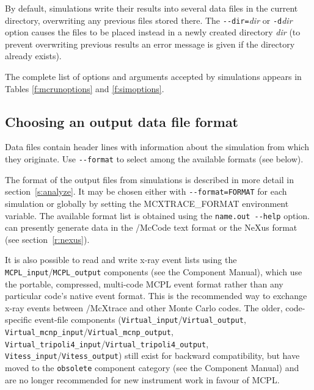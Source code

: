 By default, \MCX simulations write their results into several data files in the
current directory, overwriting any previous files stored there. The
\verb+--dir=+\textit{dir} or \verb+-d+\textit{dir} option causes the files to be
placed instead in a newly created directory \textit{dir} (to prevent overwriting
previous results an error message is given if the directory already exists).


The complete list of options
and arguments accepted by \MCX simulations appears in
Tables \ref{f:mcrunoptions} and \ref{f:simoptions}.

\subsection{Choosing an output data file format}

Data files contain header lines with information about the simulation from which
they originate. Use \verb+--format+ to select among the available formats
(see below).

The format of the output files from \MCX simulations is described in more
detail in section~\ref{s:analyze}. It may be chosen either with
\verb+--format=FORMAT+ for each simulation or globally by setting the
MCXTRACE\_FORMAT environment variable.
The available format list is obtained using the \verb+name.out --help+ option.
\MCX can presently generate data in the \MCX/McCode text format or the NeXus
format (see section~\ref{r:nexus}).

It is also possible to read and write x-ray event lists using the
\texttt{MCPL\_input}/\texttt{MCPL\_output} components (see the Component
Manual), which use the portable, compressed, multi-code MCPL event format
rather than any particular code's native event format. This is the
recommended way to exchange x-ray events between \MCX/McXtrace and other
Monte Carlo codes. The older, code-specific event-file
components (\texttt{Virtual\_input}/\texttt{Virtual\_output},
\texttt{Virtual\_mcnp\_input}/\texttt{Virtual\_mcnp\_output},
\texttt{Virtual\_tripoli4\_input}/\texttt{Virtual\_tripoli4\_output},
\texttt{Vitess\_input}/\texttt{Vitess\_output}) still exist for backward
compatibility, but have moved to the \texttt{obsolete} component category
(see the Component Manual) and are no longer recommended for new
instrument work in favour of MCPL.  

